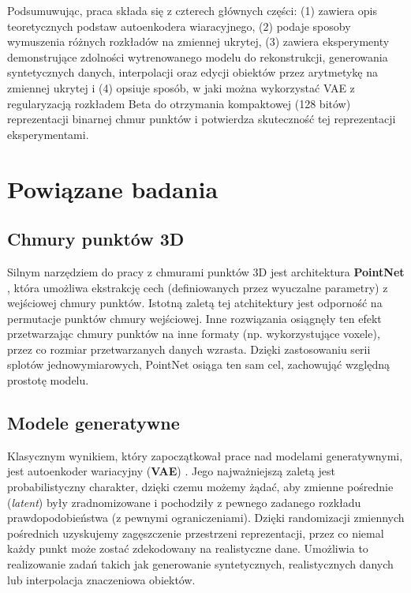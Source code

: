 \documentclass{iithesis}
\begin{document}
Podsumuwując, praca składa się z czterech głównych części: (1) zawiera opis teoretycznych podstaw
autoenkodera wiaracyjnego, (2) podaje sposoby wymuszenia różnych rozkładów na zmiennej ukrytej,
(3) zawiera eksperymenty demonstrujące zdolności wytrenowanego modelu do rekonstrukcji,
generowania syntetycznych danych, interpolacji oraz edycji obiektów przez arytmetykę na zmiennej ukrytej
i (4) opsiuje sposób, w jaki można wykorzystać VAE z regularyzacją rozkładem Beta do otrzymania
kompaktowej (128 bitów) reprezentacji binarnej chmur punktów i potwierdza skuteczność tej
reprezentacji eksperymentami.

\chapter{Powiązane badania}

\section{Chmury punktów 3D}
\label{sec:related_pointnet}
Silnym narzędziem do pracy z chmurami punktów 3D jest architektura \textbf{PointNet} \cite{pointnet},
która umożliwa ekstrakcję cech (definiowanych przez wyuczalne parametry) z wejściowej chmury punktów.
Istotną zaletą tej atchitektury jest odporność na permutacje punktów chmury wejściowej.
Inne rozwiązania osiągnęły ten efekt przetwarzając chmury punktów na inne formaty (np. wykorzystujące voxele),
przez co rozmiar przetwarzanych danych wzrasta. Dzięki zastosowaniu serii splotów jednowymiarowych,
PointNet osiąga ten sam cel, zachowująć względną prostotę modelu.

\section{Modele generatywne}
Klasycznym wynikiem, który zapoczątkował prace nad modelami generatywnymi, jest autoenkoder wariacyjny
(\textbf{VAE}) \cite{vae}. Jego najważniejszą zaletą jest probabilistyczny charakter,
dzięki czemu możemy żądać, aby zmienne pośrednie (\textit{latent}) były zradnomizowane i pochodziły
z pewnego zadanego rozkładu prawdopodobieństwa (z pewnymi ograniczeniami).
Dzięki randomizacji zmiennych pośrednich uzyskujemy zagęszczenie przestrzeni reprezentacji,
przez co niemal każdy punkt może zostać zdekodowany na realistyczne dane.
Umożliwia to realizowanie zadań takich jak generowanie syntetycznych,
realistycznych danych lub interpolacja znaczeniowa obiektów.
\end{document}
